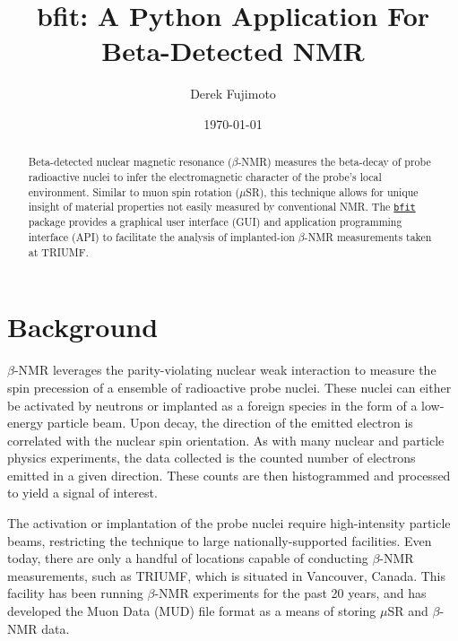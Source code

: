 \documentclass[aps, prb, twocolumn, reprint, superscriptaddress, floatfix, citeautoscript, longbibliography]{revtex4-1}
\begin{document}
\title{bfit: A Python Application For Beta-Detected NMR}
\author{Derek Fujimoto}
\date{\today}

\begin{abstract}
Beta-detected nuclear magnetic resonance ($\beta$-NMR) measures the beta-decay of probe radioactive nuclei to infer the electromagnetic character of the probe's local environment. Similar to muon spin rotation ($\mu$SR), this technique allows for unique insight of material properties not easily measured by conventional NMR. The \href{https://github.com/dfujim/bfit}{\texttt{bfit}} package provides a graphical user interface (GUI) and application programming interface (API) to facilitate the analysis of implanted-ion $\beta$-NMR measurements taken at TRIUMF.
\end{abstract}

\maketitle

\section{Background}

$\beta$-NMR leverages the parity-violating nuclear weak interaction to measure the spin precession of a ensemble of radioactive probe nuclei\cite{MacFarlane2015}. These nuclei can either be activated by neutrons or implanted as a foreign species in the form of a low-energy particle beam. Upon decay, the direction of the emitted electron is correlated with the nuclear spin orientation. As with many nuclear and particle physics experiments, the data collected is the counted number of electrons emitted in a given direction. These counts are then histogrammed and processed to yield a signal of interest.

The activation or implantation of the probe nuclei require high-intensity particle beams, restricting the technique to large nationally-supported facilities. Even today, there are only a handful of locations capable of conducting $\beta$-NMR measurements, such as TRIUMF, which is situated in Vancouver, Canada. This facility has been running $\beta$-NMR experiments for the past 20 years, and has developed the Muon Data (MUD) file format\cite{Whidden1994} as a means of storing $\mu$SR and $\beta$-NMR data.
\end{document}
